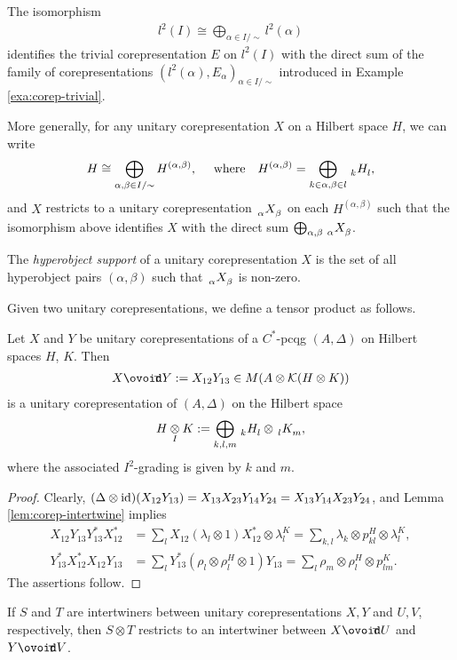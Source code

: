 \begin{Exa} \label{exa:decompose-trivial}
 The isomorphism
  \begin{align*}
    l^{2}(I) \cong \bigoplus_{\alpha \in I/\sim} l^{2}(\alpha)
  \end{align*}
  identifies the trivial corepresentation $E$ on $l^{2}(I)$ with the
  direct sum of the family of corepresentations
  $(l^{2}(\alpha),E_{\alpha})_{\alpha \in I/\sim}$ introduced in
  Example \ref{exa:corep-trivial}.

More generally,  for any unitary corepresentation $X$ on a Hilbert space $H$, we can write
\begin{align*}
  H \cong \bigoplus_{\alpha,\beta \in I/\sim} H^{(\alpha,\beta)}, \  \quad \text{where} \quad H^{(\alpha,\beta)} = \bigoplus_{k\in \alpha,\beta\in l} \Grd{H}{k}{l},
\end{align*}
and $X$ restricts to a unitary corepresentation $\Grd{X}{\alpha}{\beta}$ on each $H^{(\alpha,\beta)}$ such that
the isomorphism above identifies $X$ with the direct sum $\bigoplus_{\alpha,\beta} \Grd{X}{\alpha}{\beta}$.
\end{Exa}
\begin{Def}
 The \emph{hyperobject support}
  of a unitary corepresentation $X$ is the set of all hyperobject
  pairs $(\alpha,\beta)$ such that $\Grd{X}{\alpha}{\beta}$ is
  non-zero.
\end{Def}
Given two unitary corepresentations, we define a tensor product as follows.
\begin{Lem}
  Let $X$ and $Y$ be unitary corepresentations of a $C^{*}$-pcqg $(A,\Delta)$ on Hilbert spaces $H$,
  $K$. Then
    \begin{align*}
      X \Circt Y:= X_{12}Y_{13} \in M(A \otimes \mathcal{K}(H \otimes K))
    \end{align*}
    is a unitary corepresentation of $(A,\Delta)$ on the Hilbert space
    \begin{align*}
      H \itimes K := \bigoplus_{k,l,m} \Grd{H}{k}{l} \otimes \Grd{K}{l}{m},
    \end{align*}
    where the  associated $I^{2}$-grading is given by  $k$ and $m$.
\end{Lem}
\begin{proof}
Clearly,
$(\Delta \otimes \operatorname{id})(X_{12}Y_{13}) = X_{13}X_{23}Y_{14}Y_{24} =
    X_{13}Y_{14}X_{23}Y_{24}$,
and Lemma \ref{lem:corep-intertwine} implies 
\begin{align*} %
  X_{12}Y_{13}Y_{13}^{*}X_{12}^{*} &= \sum_{l} X_{12}(\lambda_{l}
  \otimes 1)X_{12}^* \otimes \lambda_{l}^{K} = \sum_{k,l} \lambda_{k}
  \otimes p_{kl}^{H} \otimes \lambda_{l}^{K}, \\
  Y_{13}^{*}X_{12}^{*}X_{12}Y_{13} &= \sum_{l} Y_{13}^{*}(\rho_{l}
  \otimes \rho_{l}^{H}\otimes 1)Y_{13}  = \sum_{l} \rho_{m} \otimes
  \rho_{l}^{H} \otimes p_{lm}^{K}. 
\end{align*}
The assertions follow. 
\end{proof}
If $S$ and $T$ are intertwiners between unitary corepresentations $X,Y$ and $U,V$, respectively,
then $S\otimes T$ restricts to an intertwiner between $X\Circt U$ and $Y\Circt V$.  

